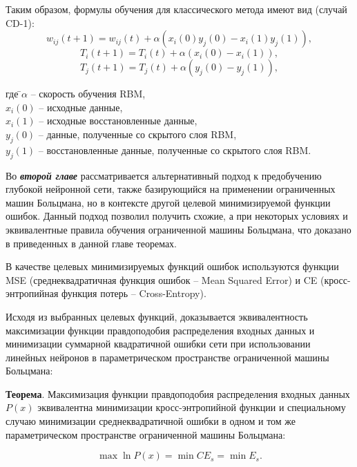 \documentclass{thesisby}
\begin{document}
Таким образом, формулы обучения для классического метода имеют вид (случай CD-1):
\begin{equation*}
	w_{ij}(t+1)=w_{ij}(t)+\alpha(x_i(0)y_j(0)-x_i(1)y_j(1)),
\end{equation*}
\begin{equation*}
    T_i(t+1)=T_i(t)+\alpha(x_i(0)-x_i(1)),
\end{equation*}
\begin{equation*}
    T_j(t+1)=T_j(t)+\alpha(y_j(0)-y_j(1)),
\end{equation*}
\begin{tabbing}
где \=$\alpha$ -- скорость обучения RBM,\\
\>$x_i(0)$ -- исходные данные,\\
\>$x_i(1)$ -- исходные восстановленные данные,\\
\>$y_j(0)$ -- данные, полученные со скрытого слоя RBM,\\
\>$y_j(1)$ -- восстановленные данные, полученные со скрытого слоя RBM.
\end{tabbing}
 
Во \textbf{\textit{второй главе}} рассматривается альтернативный подход к предобучению глубокой нейронной сети, также базирующийся на применении ограниченных машин Больцмана, но в контексте другой целевой минимизируемой функции ошибок. Данный подход позволил получить схожие, а при некоторых условиях и эквивалентные правила обучения ограниченной машины Больцмана, что доказано в приведенных в данной главе теоремах.
	
В качестве целевых минимизируемых функций ошибок используются функции MSE (среднеквадратичная функция ошибок -- Mean Squared Error) и CE (кросс-энтропийная функция потерь -- Cross-Entropy).

Исходя из выбранных целевых функций, доказывается эквивалентность максимизации функции правдоподобия распределения входных данных и минимизации суммарной квадратичной ошибки сети при использовании линейных нейронов в параметрическом пространстве ограниченной машины Больцмана:

\textbf{Теорема}. Максимизация функции правдоподобия распределения входных данных $P(x)$ эквивалентна минимизации кросс-энтропийной функции и специальному случаю минимизации среднеквадратичной ошибки в одном и том же параметрическом пространстве ограниченной машины Больцмана:

\begin{equation*}
    \max{\ln{P(x)}} = \min{CE_s} = \min{E_s}.
\end{equation*}
\end{document}

